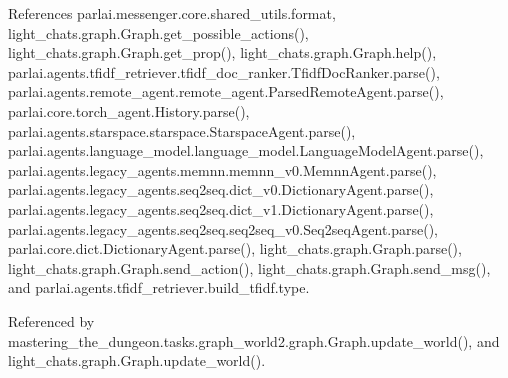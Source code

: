 References parlai.\+messenger.\+core.\+shared\+\_\+utils.\+format, light\+\_\+chats.\+graph.\+Graph.\+get\+\_\+possible\+\_\+actions(), light\+\_\+chats.\+graph.\+Graph.\+get\+\_\+prop(), light\+\_\+chats.\+graph.\+Graph.\+help(), parlai.\+agents.\+tfidf\+\_\+retriever.\+tfidf\+\_\+doc\+\_\+ranker.\+Tfidf\+Doc\+Ranker.\+parse(), parlai.\+agents.\+remote\+\_\+agent.\+remote\+\_\+agent.\+Parsed\+Remote\+Agent.\+parse(), parlai.\+core.\+torch\+\_\+agent.\+History.\+parse(), parlai.\+agents.\+starspace.\+starspace.\+Starspace\+Agent.\+parse(), parlai.\+agents.\+language\+\_\+model.\+language\+\_\+model.\+Language\+Model\+Agent.\+parse(), parlai.\+agents.\+legacy\+\_\+agents.\+memnn.\+memnn\+\_\+v0.\+Memnn\+Agent.\+parse(), parlai.\+agents.\+legacy\+\_\+agents.\+seq2seq.\+dict\+\_\+v0.\+Dictionary\+Agent.\+parse(), parlai.\+agents.\+legacy\+\_\+agents.\+seq2seq.\+dict\+\_\+v1.\+Dictionary\+Agent.\+parse(), parlai.\+agents.\+legacy\+\_\+agents.\+seq2seq.\+seq2seq\+\_\+v0.\+Seq2seq\+Agent.\+parse(), parlai.\+core.\+dict.\+Dictionary\+Agent.\+parse(), light\+\_\+chats.\+graph.\+Graph.\+parse(), light\+\_\+chats.\+graph.\+Graph.\+send\+\_\+action(), light\+\_\+chats.\+graph.\+Graph.\+send\+\_\+msg(), and parlai.\+agents.\+tfidf\+\_\+retriever.\+build\+\_\+tfidf.\+type.



Referenced by mastering\+\_\+the\+\_\+dungeon.\+tasks.\+graph\+\_\+world2.\+graph.\+Graph.\+update\+\_\+world(), and light\+\_\+chats.\+graph.\+Graph.\+update\+\_\+world().


